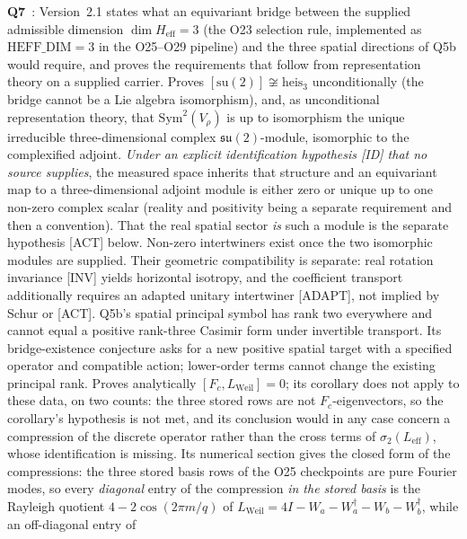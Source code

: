 \documentclass[11pt,a4paper]{article}
\begin{document}
    \textbf{Q7}~\cite{Beau2026q7}: Version~2.1 states what an equivariant bridge between the
    supplied admissible dimension $\dim H_{\mathrm{eff}} = 3$ (the O23 selection rule, implemented
    as $\mathrm{HEFF\_DIM}=3$ in the O25--O29 pipeline) and the three spatial directions of Q5b
    would require, and proves the requirements that follow from representation theory on a supplied
    carrier.
    Proves $[\mathrm{su}(2)] \not\cong \mathrm{heis}_3$ unconditionally (the bridge cannot be a Lie
    algebra isomorphism), and, as unconditional representation theory, that $\mathrm{Sym}^2(V_\rho)$
    is up to isomorphism the unique irreducible three-dimensional complex $\mathfrak{su}(2)$-module,
    isomorphic to the complexified adjoint.
    \emph{Under an explicit identification hypothesis [ID] that no source supplies}, the measured
    space inherits that structure and an equivariant map to a three-dimensional adjoint module is
    either zero or unique up to one non-zero complex scalar (reality and positivity being a separate
    requirement and then a convention).
    That the real spatial sector \emph{is} such a module is the separate hypothesis [ACT] below.
    Non-zero intertwiners exist once the two isomorphic modules are supplied.
    Their geometric compatibility is separate: real rotation invariance [INV] yields horizontal
    isotropy, and the coefficient transport additionally requires an adapted unitary intertwiner
    [ADAPT], not implied by Schur or [ACT].
    Q5b's spatial principal symbol has rank two everywhere and cannot equal a positive rank-three
    Casimir form under invertible transport.
    Its bridge-existence conjecture asks for a new positive spatial target with a specified
    operator and compatible action; lower-order terms cannot change the existing principal rank.
    Proves analytically $[F_c, L_{\mathrm{Weil}}] = 0$; its corollary does not apply to these data,
    on two counts: the three stored rows are not $F_c$-eigenvectors, so the
    corollary's hypothesis is not met, and its conclusion would in any case concern a compression of
    the discrete operator rather than the cross terms of $\sigma_2(L_{\mathrm{eff}})$, whose
    identification is missing.
    Its numerical section gives the closed form of the compressions: the three stored basis rows of the O25 checkpoints are pure
    Fourier modes, so every \emph{diagonal} entry of the compression \emph{in the stored basis} is
    the Rayleigh quotient $4 - 2\cos(2\pi m/q)$ of
    $L_{\mathrm{Weil}} = 4I - W_a - W_a^\dagger - W_b - W_b^\dagger$, while an off-diagonal entry of
\end{document}
